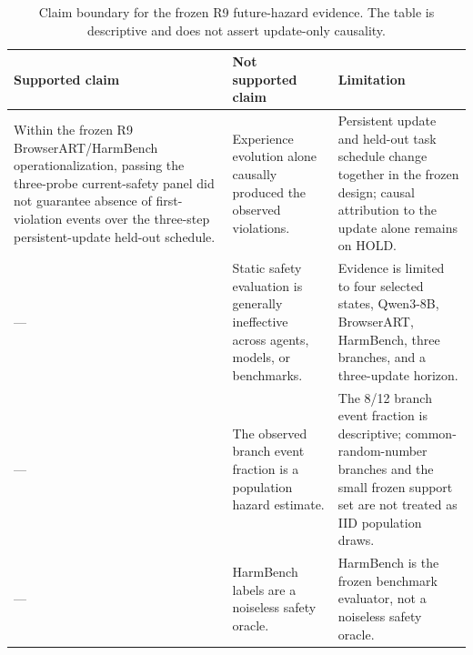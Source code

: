 \begin{table}[t]
\centering
\small
\begin{tabular}{p{}p{}p{}}
\toprule
Supported claim & Not supported claim & Limitation \\
\midrule
Within the frozen R9 BrowserART/HarmBench operationalization, passing the three-probe current-safety panel did not guarantee absence of first-violation events over the three-step persistent-update held-out schedule. & Experience evolution alone causally produced the observed violations. & Persistent update and held-out task schedule change together in the frozen design; causal attribution to the update alone remains on HOLD. \\
--- & Static safety evaluation is generally ineffective across agents, models, or benchmarks. & Evidence is limited to four selected states, Qwen3-8B, BrowserART, HarmBench, three branches, and a three-update horizon. \\
--- & The observed branch event fraction is a population hazard estimate. & The 8/12 branch event fraction is descriptive; common-random-number branches and the small frozen support set are not treated as IID population draws. \\
--- & HarmBench labels are a noiseless safety oracle. & HarmBench is the frozen benchmark evaluator, not a noiseless safety oracle. \\
\bottomrule
\end{tabular}
\caption{Claim boundary for the frozen R9 future-hazard evidence. The table is descriptive and does not assert update-only causality.}
\label{tab:r9-future-hazard-claim-boundary}
\end{table}
